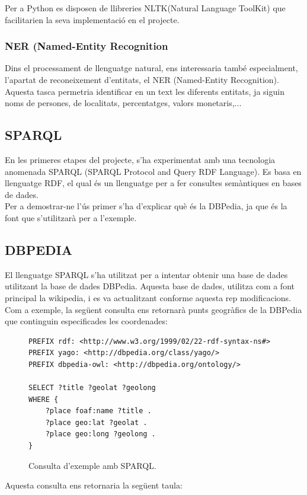 \documentclass[12pt,a4paper,openright,oneside]{article}
\numberwithin{equation}{section}
\theoremstyle{definition}
\begin{document}
Per a Python es disposen de llibreries NLTK(Natural Language ToolKit) que facilitarien la seva implementació en el projecte.\cite{nlp}
\subsubsection*{NER (Named-Entity Recognition}
Dins el processament de llenguatge natural, ens interessaria també especialment, l'apartat de reconeixement d'entitats, el NER (Named-Entity Recognition).\\
Aquesta tasca permetria identificar en un text les diferents entitats, ja siguin noms de persones, de localitats, percentatges, valors monetaris,...\cite{ner}
\subsection*{SPARQL}
En les primeres etapes del projecte, s'ha experimentat amb una tecnologia anomenada SPARQL (SPARQL Protocol and Query RDF Language). Es basa en llenguatge RDF, el qual és un llenguatge per a fer consultes semàntiques en bases de dades.\\Per a demostrar-ne l'ús primer s'ha d'explicar què és la DBPedia, ja que és la font que s'utilitzarà per a l'exemple.\cite{sparql}\\
\subsection*{DBPEDIA}
El llenguatge SPARQL s'ha utilitzat per a intentar obtenir una base de dades utilitzant la base de dades DBPedia. Aquesta base de dades, utilitza com a font principal la wikipedia, i es va actualitzant conforme aquesta rep modificacions.\\
Com a exemple, la següent consulta ens retornarà punts geogràfics de la DBPedia que continguin especificades les coordenades:

\begin{figure}[!htbp]
\begin{verbatim}
PREFIX rdf: <http://www.w3.org/1999/02/22-rdf-syntax-ns#>
PREFIX yago: <http://dbpedia.org/class/yago/>
PREFIX dbpedia-owl: <http://dbpedia.org/ontology/>

SELECT ?title ?geolat ?geolong
WHERE {
    ?place foaf:name ?title .
    ?place geo:lat ?geolat .
    ?place geo:long ?geolong .
}
\end{verbatim}
\caption{Consulta d'exemple amb SPARQL.}
\end{figure}
\newpage
Aquesta consulta ens retornaria la següent taula:
\end{document}
